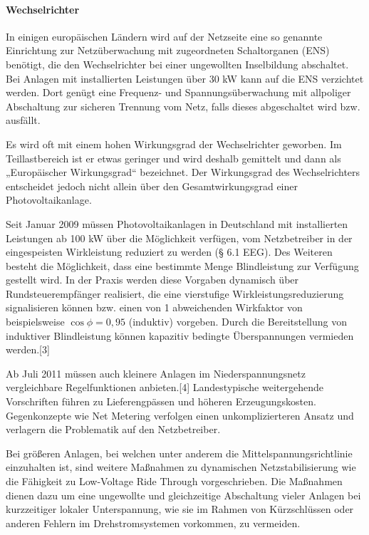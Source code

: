 \paragraph{Wechselrichter}

In einigen europäischen Ländern wird auf der Netzseite eine so genannte Einrichtung zur Netzüberwachung mit zugeordneten Schaltorganen (ENS) benötigt, die den Wechselrichter bei einer ungewollten Inselbildung abschaltet. Bei Anlagen mit installierten Leistungen über 30 \si{kW} kann auf die ENS verzichtet werden. Dort genügt eine Frequenz- und Spannungsüberwachung mit allpoliger Abschaltung zur sicheren Trennung vom Netz, falls dieses abgeschaltet wird bzw. ausfällt. 

Es wird oft mit einem hohen Wirkungsgrad der Wechselrichter geworben. Im Teillastbereich ist er etwas geringer und wird deshalb gemittelt und dann als „Europäischer Wirkungsgrad“ bezeichnet. Der Wirkungsgrad des Wechselrichters entscheidet jedoch nicht allein über den Gesamtwirkungsgrad einer Photovoltaikanlage. 

\iffalse

Seit Januar 2009 müssen Photovoltaikanlagen in Deutschland mit installierten Leistungen ab 100 \si{kW} über die Möglichkeit verfügen, vom Netzbetreiber in der eingespeisten Wirkleistung reduziert zu werden (§ 6.1 EEG). Des Weiteren besteht die Möglichkeit, dass eine bestimmte Menge Blindleistung zur Verfügung gestellt wird. In der Praxis werden diese Vorgaben dynamisch über Rundsteuerempfänger realisiert, die eine vierstufige Wirkleistungsreduzierung signalisieren können bzw. einen von 1 abweichenden Wirkfaktor von beispielsweise $\cos \phi = 0,95$ (induktiv) vorgeben. Durch die Bereitstellung von induktiver Blindleistung können kapazitiv bedingte Überspannungen vermieden werden.[3] 

Ab Juli 2011 müssen auch kleinere Anlagen im Niederspannungsnetz vergleichbare Regelfunktionen anbieten.[4] Landestypische weitergehende Vorschriften führen zu Lieferengpässen und höheren Erzeugungskosten. Gegenkonzepte wie Net Metering verfolgen einen unkomplizierteren Ansatz und verlagern die Problematik auf den Netzbetreiber. 

Bei größeren Anlagen, bei welchen unter anderem die Mittelspannungsrichtlinie einzuhalten ist, sind weitere Maßnahmen zu dynamischen Netzstabilisierung wie die Fähigkeit zu Low-Voltage Ride Through vorgeschrieben. Die Maßnahmen dienen dazu um eine ungewollte und gleichzeitige Abschaltung vieler Anlagen bei kurzzeitiger lokaler Unterspannung, wie sie im Rahmen von Kürzschlüssen oder anderen Fehlern im Drehstromsystemen vorkommen, zu vermeiden. 


